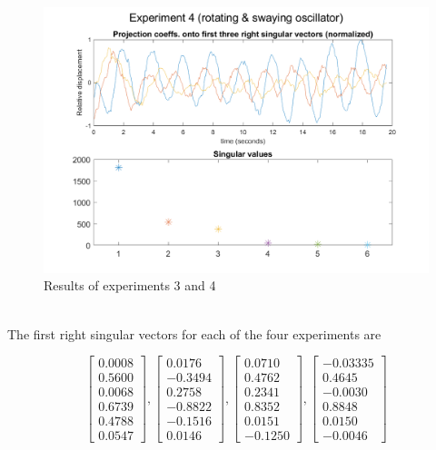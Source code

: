 \documentclass{article}
\begin{document}
\begin{figure}[!h]
	\centering
	\includegraphics[scale=0.62]{fig4}
	\caption{Results of experiments 3 and 4}
\end{figure}

\newpage 
\;\\\newpage
The first right singular vectors for each of the four experiments are

\begin{equation}
	\begin{bmatrix}
		0.0008\\0.5600 \\
		0.0068 \\
		0.6739 \\
		0.4788\\
		0.0547
	\end{bmatrix}, \begin{bmatrix}
	0.0176 \\ -0.3494 \\ 0.2758 \\ -0.8822 \\ -0.1516 \\ 0.0146
\end{bmatrix}, \begin{bmatrix}
0.0710 \\ 0.4762 \\ 0.2341 \\ 0.8352 \\ 0.0151 \\ -0.1250
\end{bmatrix}, \begin{bmatrix}
-0.03335 \\ 0.4645 \\ -0.0030 \\ 0.8848 \\ 0.0150 \\ -0.0046
\end{bmatrix}
\label{eqn:vector}
\end{equation}
\end{document}
